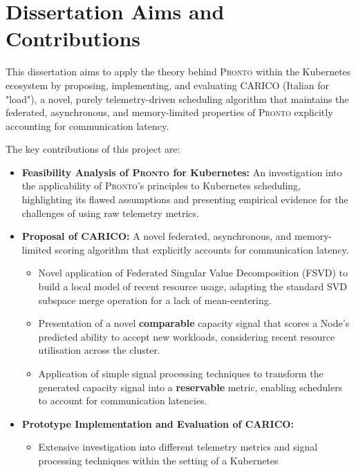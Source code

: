 \section{Dissertation Aims and Contributions}

This dissertation aims to apply the theory behind \textsc{Pronto} within the
Kubernetes ecosystem by proposing, implementing, and evaluating \textsc{CARICO} (Italian
for "load"), a novel, purely telemetry-driven scheduling algorithm that
maintains the federated, asynchronous, and memory-limited properties of
\textsc{Pronto} explicitly accounting for communication latency.

The key contributions of this project are:
\begin{itemize}
    \item \textbf{Feasibility Analysis of \textsc{Pronto} for Kubernetes:} An
        investigation into the applicability of \textsc{Pronto}'s principles to
        Kubernetes scheduling, highlighting its flawed assumptions and
        presenting empirical evidence for the challenges of using raw telemetry
        metrics.
    \item \textbf{Proposal of \textsc{CARICO}:} A novel federated, asynchronous,
        and memory-limited scoring algorithm that explicitly accounts for
        communication latency.
    \begin{itemize}
        \item Novel application of Federated Singular Value Decomposition (FSVD)
            to build a local model of recent resource usage, adapting the
            standard SVD subspace merge operation for a lack of mean-centering.
        \item Presentation of a novel \textbf{comparable} capacity signal that scores a Node's
            predicted ability to accept new workloads, considering recent
            resource utilisation across the cluster.
        \item Application of simple signal processing techniques to transform
            the generated capacity signal into a \textbf{reservable} metric,
            enabling schedulers to account for communication latencies.
    \end{itemize}
    \item \textbf{Prototype Implementation and Evaluation of \textsc{CARICO}:}
    \begin{itemize}
        \item Extensive investigation into different telemetry metrics and
            signal processing techniques within the setting of a Kubernetes

\end{itemize}
\end{itemize}
